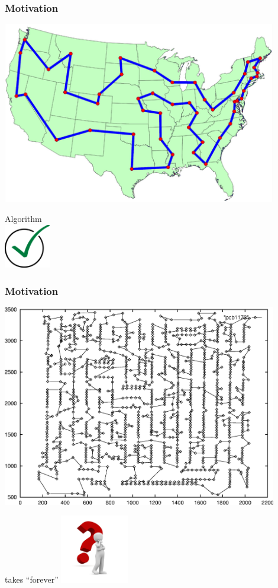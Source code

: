 \documentclass[aspectratio=1610]{beamer}
\begin{document}
\begin{frame}
	\frametitle{Motivation}
	\begin{minipage}{0.45\textwidth}
		\begin{center}
			\includegraphics[width=0.9\textwidth]{graphics/48StatesTSP.png}

			\bigskip
			Algorithm \\
			\includegraphics[width=2cm]{graphics/hook.png}
		\end{center}
	\end{minipage}
	\qquad
	\frametitle{Motivation}
	\begin{minipage}{0.45\textwidth}
		\begin{center}
			\includegraphics[width=0.9\textwidth]{graphics/TSPLeiter2opt.jpg}

			\bigskip
			 \alert{takes ``forever''}
			\includegraphics[width=3cm]{graphics/question-mark.jpg}
		\end{center}
	\end{minipage}

\end{frame}
\end{document}
